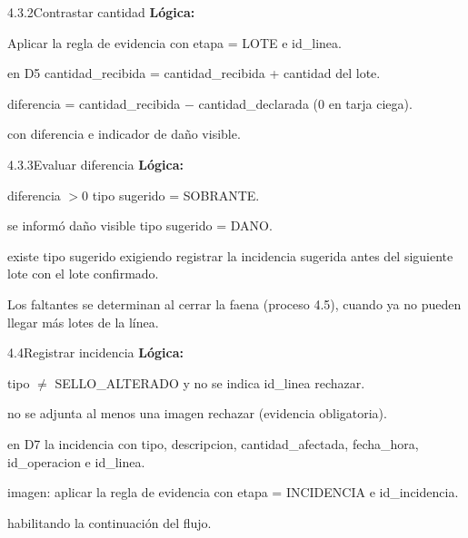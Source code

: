 \begin{minispec}{4.3.2}{Contrastar cantidad}
\textbf{Lógica:}
\begin{logica}
    \item Aplicar la regla de evidencia con etapa = LOTE e id\_linea.
    \item {} en D5 cantidad\_recibida = cantidad\_recibida + cantidad del lote.
    \item diferencia = cantidad\_recibida $-$ cantidad\_declarada (0 en tarja ciega).
    \item {}  con diferencia e indicador de daño visible.
\end{logica}
\end{minispec}

\begin{minispec}{4.3.3}{Evaluar diferencia}
\textbf{Lógica:}
\begin{logica}
    \item {} diferencia $> 0$  tipo sugerido = SOBRANTE.
    \item {} se informó daño visible  tipo sugerido = DANO.
    \item {} existe tipo sugerido  
    exigiendo registrar la incidencia sugerida antes del siguiente lote 
     con el lote confirmado.
    \item Los faltantes se determinan al cerrar la faena (proceso 4.5), cuando ya no pueden
    llegar más lotes de la línea.
\end{logica}
\end{minispec}

\begin{minispec}{4.4}{Registrar incidencia}
\textbf{Lógica:}
\begin{logica}
    \item {} tipo $\neq$ SELLO\_ALTERADO y no se indica id\_linea  rechazar.
    \item {} no se adjunta al menos una imagen  rechazar (evidencia
    obligatoria).
    \item {} en D7 la incidencia con tipo, descripcion, cantidad\_afectada,
    fecha\_hora, id\_operacion e id\_linea.
    \item {} imagen: aplicar la regla de evidencia con etapa = INCIDENCIA e
    id\_incidencia.
    \item {}  habilitando la continuación del flujo.
\end{logica}
\end{minispec}

